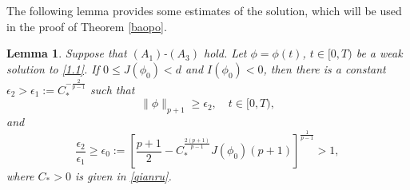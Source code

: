 \documentclass[11pt,a4paper]{article}
\numberwithin{equation}{section}
\newtheorem{lemma}{Lemma}[section]
\numberwithin{remark}{section}
\begin{document}
The following lemma provides some estimates of the solution, which will be used in the proof of Theorem \ref{baopo}.
\begin{lemma}\label{yinliqi}
Suppose that $(A_1)$-$(A_3)$ hold. Let $\phi=\phi(t)$, $t\in[0,T)$ be a weak solution to \eqref{1.1}. If $0\leq J(\phi_0)<d$ and $I(\phi_0)<0$, then there is a constant $\epsilon_2>\epsilon_1:=C_*^{-\frac{2}{p-1}}$ such that
\begin{equation}\label{9}
\|\phi\|_{p+1}\geq\epsilon_2,\quad t\in[0,T),
\end{equation}
and
\begin{equation}\label{11}
\frac{\epsilon_2}{\epsilon_1}\geq\epsilon_0:=\left[\frac{p+1}{2}-C_*^{\frac{2(p+1)}{p-1}}J(\phi_0)(p+1)\right]^{\frac{1}{p-1}}>1,
\end{equation}
where $C_*>0$ is given in \eqref{qianru}.
\end{lemma}
\end{document}
